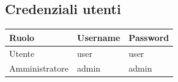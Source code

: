 \documentclass[a4paper, 12pt]{article}
\begin{document}
\begin{titlepage}
\section*{\centering Credenziali utenti}
\begin{center}
\begin{longtable}{|l|l|l|}
\hline
\rowcolor[HTML]{094074}
{\color[HTML]{FFFFFF} Ruolo} & {\color[HTML]{FFFFFF} Username} & {\color[HTML]{FFFFFF} Password}\\
\hline
Utente & user & user\\
\hline
Amministratore & admin & admin\\
\hline
\end{longtable}
\end{center}
\end{titlepage}

\newpage
\tableofcontents
\end{document}
